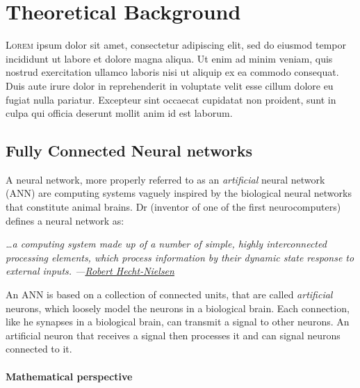 

\chapter{Theoretical Background}



\lettrine{L}{orem} ipsum dolor sit amet, consectetur
adipiscing elit, sed do eiusmod tempor incididunt ut labore et dolore magna
aliqua. Ut enim ad minim veniam, quis nostrud exercitation ullamco laboris nisi
ut aliquip ex ea commodo consequat. Duis aute irure dolor in reprehenderit in
voluptate velit esse cillum dolore eu fugiat nulla pariatur. Excepteur sint
occaecat cupidatat non proident, sunt in culpa qui officia deserunt mollit anim
id est laborum.


\section{Fully Connected Neural networks}

A neural network, more properly referred to as an \textit{artificial} neural
network (ANN) are computing systems vaguely inspired by the biological neural
networks that constitute animal brains. Dr
(inventor of one of the first neurocomputers) defines a neural network as:

\begin{quoteBox}
  \itshape
  \ldots a computing system made up of a number of simple, highly interconnected
  processing elements, which process information by their dynamic state response
  to external inputs.
  \tcblower
  \hfill \upshape
  ---\href{https://en.wikipedia.org/wiki/Robert_Hecht-Nielsen}
  {Robert Hecht-Nielsen}
\end{quoteBox}

An ANN is based on a collection of connected units, that are called
\textit{artificial} neurons, which loosely model the neurons in a biological
brain. Each connection, like he synapses in a biological brain, can transmit a
signal to other neurons. An artificial neuron that receives a signal then
processes it and can signal neurons connected to it.


\subsubsection{Mathematical perspective}

